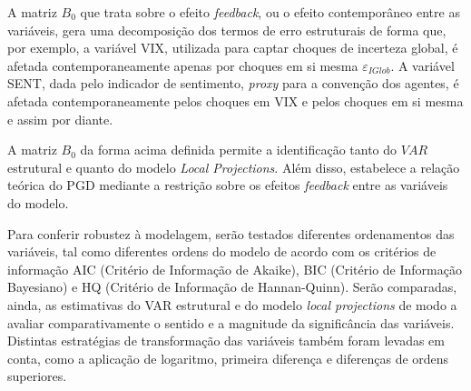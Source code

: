 A matriz \(B_0\) que trata sobre o efeito \textit{feedback}, ou o efeito contemporâneo entre as variáveis, gera uma decomposição dos termos de erro estruturais de forma que, por exemplo, a variável VIX, utilizada para captar choques de incerteza global, é afetada contemporaneamente apenas por choques em si mesma \(\varepsilon_{IGlob}\). A variável SENT, dada pelo indicador de sentimento, \textit{proxy} para a convenção dos agentes, é afetada contemporaneamente pelos choques em VIX e pelos choques em si mesma e assim por diante. 

A matriz \(B_0\) da forma acima definida permite a identificação tanto do \(VAR\) estrutural e quanto do modelo \textit{Local Projections}. Além disso, estabelece a relação teórica do PGD mediante a restrição sobre os efeitos \textit{feedback} entre as variáveis do modelo. 

Para conferir robustez à modelagem, serão testados diferentes ordenamentos das variáveis, tal como diferentes ordens do modelo de acordo com os critérios de informação AIC (Critério de Informação de Akaike), BIC (Critério de Informação Bayesiano) e HQ (Critério de Informação de Hannan-Quinn). Serão comparadas, ainda, as estimativas do VAR estrutural e do modelo \textit{local projections} de modo a avaliar comparativamente o sentido e a magnitude da significância das variáveis. Distintas estratégias de transformação das variáveis também foram levadas em conta, como a aplicação de logaritmo, primeira diferença e diferenças de ordens superiores.
